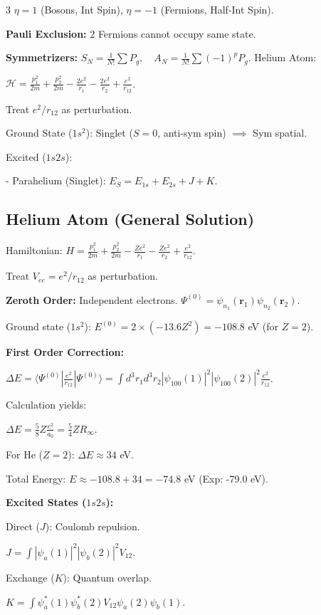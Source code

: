 \documentclass[10pt,a4paper]{article}
\begin{document}
\begin{multicols*}{3}
$\eta=1$ (Bosons, Int Spin), $\eta=-1$ (Fermions, Half-Int Spin).

\textbf{Pauli Exclusion:} 2 Fermions cannot occupy same state.

\textbf{Symmetrizers:} $S_N = \frac{1}{N!} \sum P_g, \quad A_N = \frac{1}{N!} \sum (-1)^p P_g$.
Helium Atom: 

$\mathcal{H} = \frac{p_1^2}{2m} + \frac{p_2^2}{2m} - \frac{2e^2}{r_1} - \frac{2e^2}{r_2} + \frac{e^2}{r_{12}}$.

Treat $e^2/r_{12}$ as perturbation.

Ground State ($1s^2$): Singlet ($S=0$, anti-sym spin) $\implies$ Sym spatial.

Excited ($1s2s$):

- Parahelium (Singlet): $E_S = E_{1s} + E_{2s} + J + K$.

\subsection*{Helium Atom (General Solution)}

Hamiltonian: $H = \frac{p_1^2}{2m} + \frac{p_2^2}{2m} - \frac{Ze^2}{r_1} - \frac{Ze^2}{r_2} + \frac{e^2}{r_{12}}$.

Treat $V_{ee} = e^2/r_{12}$ as perturbation.

\textbf{Zeroth Order:} Independent electrons. $\Psi^{(0)} = \psi_{n_1}(\mathbf{r}_1)\psi_{n_2}(\mathbf{r}_2)$.

Ground state ($1s^2$): $E^{(0)} = 2 \times (-13.6 Z^2) = -108.8$ eV (for $Z=2$).

\textbf{First Order Correction:}

$\Delta E = \langle \Psi^{(0)} | \frac{e^2}{r_{12}} | \Psi^{(0)} \rangle = \int d^3r_1 d^3r_2 |\psi_{100}(1)|^2 |\psi_{100}(2)|^2 \frac{e^2}{r_{12}}$.

Calculation yields: 

$\Delta E = \frac{5}{8} Z \frac{e^2}{a_0} = \frac{5}{4} Z R_\infty$.

For He ($Z=2$): $\Delta E \approx 34$ eV.

Total Energy: $E \approx -108.8 + 34 = -74.8$ eV (Exp: -79.0 eV).

\textbf{Excited States ($1s2s$):}

Direct ($J$): Coulomb repulsion. 

$J = \int |\psi_a(1)|^2 |\psi_b(2)|^2 V_{12}$.

Exchange ($K$): Quantum overlap. 

$K = \int \psi_a^*(1)\psi_b^*(2) V_{12} \psi_a(2)\psi_b(1)$.


\end{multicols*}
\end{document}
